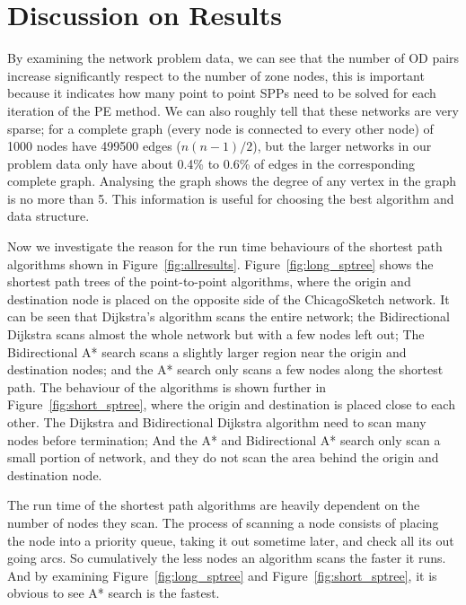 \chapter{Discussion on Results}

By examining the network problem data,
we can see that the number of OD pairs increase
significantly respect to the number of zone nodes,
this is important because it indicates how many point to point SPPs need to be solved for each iteration of the PE method.
We can also roughly tell that these networks are very sparse;
for a complete graph (every node is connected to every other node) of 1000 nodes have 499500 edges ($n(n-1)/2$),
but the larger networks in our problem data only have about 0.4\% to 0.6\% of edges in the corresponding complete graph. 
Analysing the graph shows the degree of any vertex in the graph is no more than 5.
This information is useful for choosing the best algorithm and data structure.

Now we investigate the reason for the run time behaviours of the shortest path algorithms shown in Figure~\ref{fig:allresults}.
Figure~\ref{fig:long_sptree} shows the shortest path trees of the point-to-point algorithms, where the origin and destination node is placed on the opposite side of the ChicagoSketch network.
It can be seen that Dijkstra's algorithm scans the entire network;
the Bidirectional Dijkstra scans almost the whole network but with a few nodes left out;
The Bidirectional A* search scans a slightly larger region near the origin and destination nodes;
and the A* search only scans a few nodes along the shortest path.
The behaviour of the algorithms is shown further in Figure~\ref{fig:short_sptree},
where the origin and destination is placed close to each other.
The Dijkstra and Bidirectional Dijkstra algorithm need to scan many nodes before termination;
And the A* and Bidirectional A* search only scan a small portion of network,
and they do not scan the area behind the origin and destination node.

The run time of the shortest path algorithms are heavily dependent on the number of nodes they scan.
The process of scanning a node consists of placing the node into a priority queue, taking it out sometime later, and check all its out going arcs.
So cumulatively the less nodes an algorithm scans the faster it runs.
And by examining Figure~\ref{fig:long_sptree} and Figure~\ref{fig:short_sptree},
it is obvious to see A* search is the fastest.

